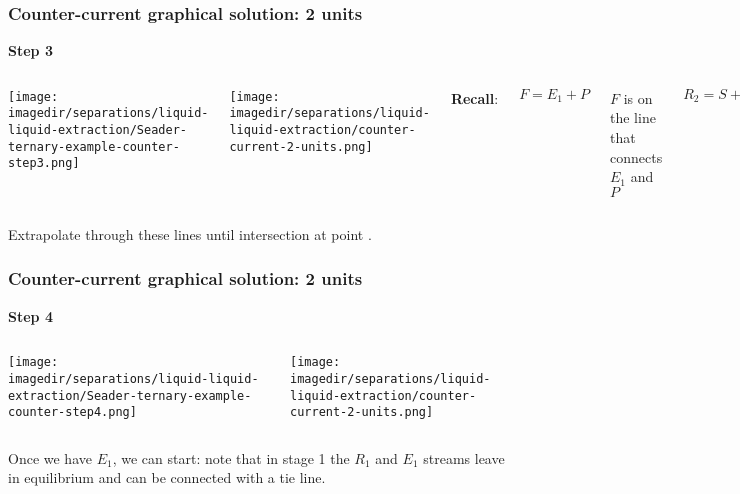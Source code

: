 \begin{frame}\frametitle{Counter-current graphical solution: 2 units}
	\textbf{Step 3}
	\begin{columns}[t]
			\begin{center}
				\texttt{[image: \\imagedir/separations/liquid-liquid-extraction/Seader-ternary-example-counter-step3.png]}
			\end{center}
			\begin{center}
				\texttt{[image: \\imagedir/separations/liquid-liquid-extraction/counter-current-2-units.png]}
			\end{center}
			\textbf{Recall}:

			\vspace{-10pt}
			\[ F = E_1 + P \]

			\vspace{-12pt}

			{\color{myOrange}\tiny$F$ is on the line that connects $E_1$ and $P$}

			\[ R_2 = S + P \]

			\vspace{-12pt}
			{\color{myOrange}\tiny$R_2$ is on the line that connects $S$ and $P$}

	\end{columns}
	\begin{exampleblock}{}
		Extrapolate through these lines until intersection at point {\color{myGreen}{$P$}}.
	\end{exampleblock}
\end{frame}

\begin{frame}\frametitle{Counter-current graphical solution: 2 units}
	\textbf{Step 4}
	\begin{columns}[t]
			\begin{center}
				\texttt{[image: \\imagedir/separations/liquid-liquid-extraction/Seader-ternary-example-counter-step4.png]}
			\end{center}
			\begin{center}
				\texttt{[image: \\imagedir/separations/liquid-liquid-extraction/counter-current-2-units.png]}
			\end{center}
	\end{columns}
	\vspace{12pt}
	Once we have $E_1$, we can start: note that in stage 1 the $R_1$ and $E_1$ streams leave in equilibrium and can be connected with a {\color{myOrange}tie line}.
	\vfill
\end{frame}

